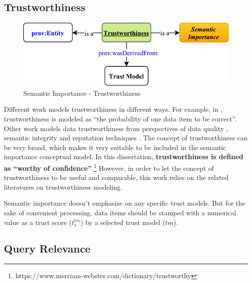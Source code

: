 \subsection{Trustworthiness}

\begin{figure}[!htbp]
	\centering
    \includegraphics[width=5in]{img/3-sit.pdf}
    \caption{Semantic Importance - Trustworthiness}
    \label{fig:3-sit}
\end{figure}

Different work models trustworthiness in different ways.
For example, in \cite{bertino2009challenge}, trustworthiness is modeled as ``the probability of one data item to be correct''. 
Other work models data trustworthiness from perspectives of data quality \cite{juran1999quality} \cite{kahn2002information} \cite{prince2004semiotic} \cite{wand1996anchoring}, semantic integrity \cite{date2004database} and reputation techniques \cite{kamvar2003eigentrust} \cite{levien2009attack}. 
The concept of trustworthiness can be very broad, which makes it very suitable to be included in the semantic importance conceptual model. 
In this dissertation, \textbf{trustworthiness is defined as ``worthy of confidence''}.\footnote{https://www.merriam-webster.com/dictionary/trustworthy}
However, in order to let the concept of trustworthiness to be useful and comparable, this work relies on the related literatures on trustworthiness modeling. 

Semantic importance doesn't emphasize on any specific trust models.
But for the sake of convenient processing, data items should be stamped with a numerical value as a trust score ($t^{tm}_{s}$) by a selected trust model ($tm$). 
%
\subsection{Query Relevance}

